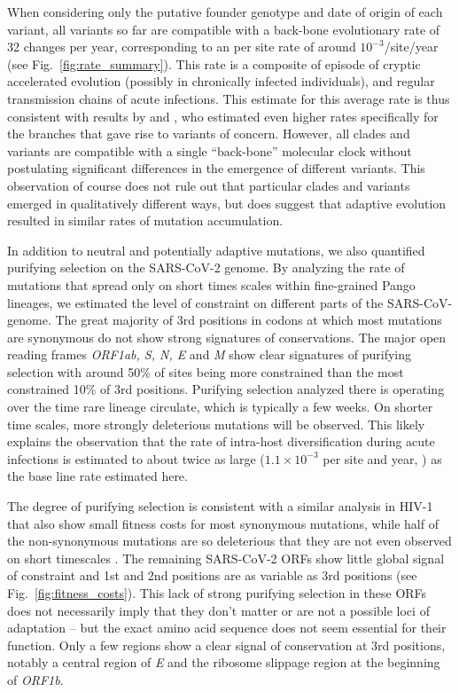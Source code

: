 \documentclass[aps,rmp, twocolumn]{revtex4}
\begin{document}
When considering only the putative founder genotype and date of origin of each variant, all variants so far are compatible with a back-bone evolutionary rate of 32 changes per year, corresponding to an per site rate of around $10^{-3}$/site/year (see Fig.~\ref{fig:rate_summary}).
This rate is a composite of episode of cryptic accelerated evolution (possibly in chronically infected individuals), and regular transmission chains of acute infections.
This estimate for this average rate is thus consistent with results by \citet{hill_origins_2022} and \citet{tay_emergence_2022}, who estimated even higher rates specifically for the branches that gave rise to variants of concern.
However, all clades and variants are compatible with a single ``back-bone'' molecular clock without postulating significant differences in the emergence of different variants.
This observation of course does not rule out that particular clades and variants emerged in qualitatively different ways, but does suggest that adaptive evolution resulted in similar rates of mutation accumulation.

In addition to neutral and potentially adaptive mutations, we also quantified purifying selection on the SARS-CoV-2 genome.
By analyzing the rate of mutations that spread only on short times scales within fine-grained Pango lineages, we estimated the level of constraint on different parts of the SARS-CoV-genome.
The great majority of 3rd positions in codons at which  most mutations are synonymous do not show strong signatures of conservations.
The major open reading frames \emph{ORF1ab, S, N, E} and \emph{M} show clear signatures of purifying selection with around 50\% of sites being more constrained than the most constrained 10\% of 3rd positions.
Purifying selection analyzed there is operating over the time rare lineage circulate, which is typically a few weeks.
On shorter time scales, more strongly deleterious mutations will be observed.
This likely explains the observation that the rate of intra-host diversification during acute infections is estimated to about twice as large ($1.1 \times 10^{-3}$ per site and year, \citep{braun_acute_2021}) as the base line rate estimated here.

The degree of purifying selection is consistent with a similar analysis in HIV-1 that also show small fitness costs for most synonymous mutations, while half of the non-synonymous mutations are so deleterious that they are not even observed on short timescales \citep{zanini_vivo_2017}.
The remaining SARS-CoV-2 ORFs show little global signal of constraint and 1st and 2nd positions are as variable as 3rd positions (see Fig.~\ref{fig:fitness_costs}).
This lack of strong purifying selection in these ORFs does not necessarily imply that they don't matter or are not a possible loci of adaptation -- but the exact amino acid sequence does not seem essential for their function.
Only a few regions show a clear signal of conservation at 3rd positions, notably a central region of \emph{E} and the ribosome slippage region at the beginning of \emph{ORF1b}.
\end{document}
